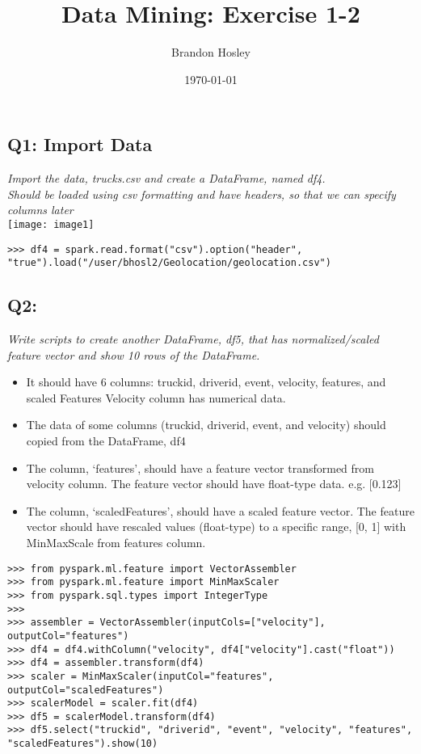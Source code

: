 \documentclass[]{article}
\title{Data Mining: Exercise 1-2}
\author{Brandon Hosley}
\date{\today}
\begin{document}
\maketitle

\subsection*{Q1: Import Data}
\emph{Import the data, trucks.csv and create a DataFrame, named df4. \\
	Should be loaded using csv formatting and have headers, so that we can specify columns later} \\
	\texttt{[image: image1]}
\begin{verbatim}
>>> df4 = spark.read.format("csv").option("header", "true").load("/user/bhosl2/Geolocation/geolocation.csv")
\end{verbatim}

\subsection*{Q2: }
\emph{Write scripts to create another DataFrame, df5, 
	that has normalized/scaled feature vector and
	show 10 rows of the DataFrame.}
	\begin{itemize}[before=\itshape,font=\normalfont]
		\item It should have 6 columns: truckid, driverid, event, velocity, features, and scaled Features Velocity column has numerical data.
		\item The data of some columns (truckid, driverid, event, and velocity) should copied from the DataFrame, df4
		\item The column, ‘features’, should have a feature vector transformed from velocity column. The feature vector should have float-type data. e.g. [0.123]
		\item The column, ‘scaledFeatures’, should have a scaled feature vector. The feature vector should have rescaled values (float-type) to a specific range, [0, 1] with MinMaxScale from features column.
	\end{itemize} 

\begin{verbatim}
>>> from pyspark.ml.feature import VectorAssembler
>>> from pyspark.ml.feature import MinMaxScaler
>>> from pyspark.sql.types import IntegerType
>>>
>>> assembler = VectorAssembler(inputCols=["velocity"], outputCol="features")
>>> df4 = df4.withColumn("velocity", df4["velocity"].cast("float"))
>>> df4 = assembler.transform(df4)
>>> scaler = MinMaxScaler(inputCol="features", outputCol="scaledFeatures")
>>> scalerModel = scaler.fit(df4)
>>> df5 = scalerModel.transform(df4)
>>> df5.select("truckid", "driverid", "event", "velocity", "features", "scaledFeatures").show(10)
\end{verbatim}
\end{document}
